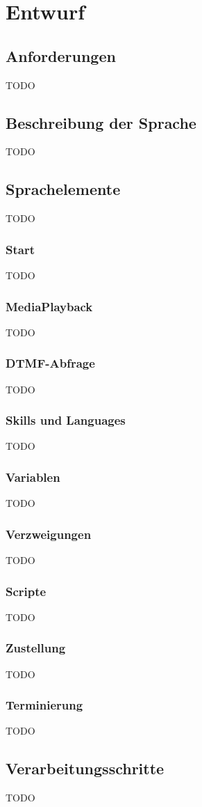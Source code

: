 \chapter{Entwurf}

\section{Anforderungen}
TODO

\section{Beschreibung der Sprache}
TODO

\section{Sprachelemente}
TODO

\subsection{Start}
TODO

\subsection{MediaPlayback}
TODO

\subsection{DTMF-Abfrage}
TODO

\subsection{Skills und Languages}
TODO

\subsection{Variablen}
TODO

\subsection{Verzweigungen}
TODO

\subsection{Scripte}
TODO

\subsection{Zustellung}
TODO

\subsection{Terminierung}
TODO

\section{Verarbeitungsschritte}
TODO
